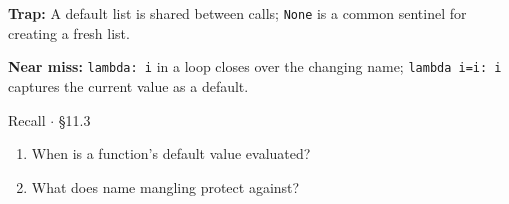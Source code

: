 \documentclass[11pt]{article}
\begin{document}
\begin{keepsection}
\begin{notebox}\textbf{Trap:} A default list is shared between calls; \texttt{None} is a common sentinel for creating a fresh list.\end{notebox}

\begin{notebox}\textbf{Near miss:} \texttt{lambda: i} in a loop closes over the changing name; \texttt{lambda i=i: i} captures the current value as a default.\end{notebox}

\begin{recallbox}{Recall \ensuremath{\cdot} §11.3}
\begin{enumerate}
\item When is a function’s default value evaluated?
\item What does name mangling protect against?
\end{enumerate}

\end{recallbox}
\end{keepsection}
\end{document}
